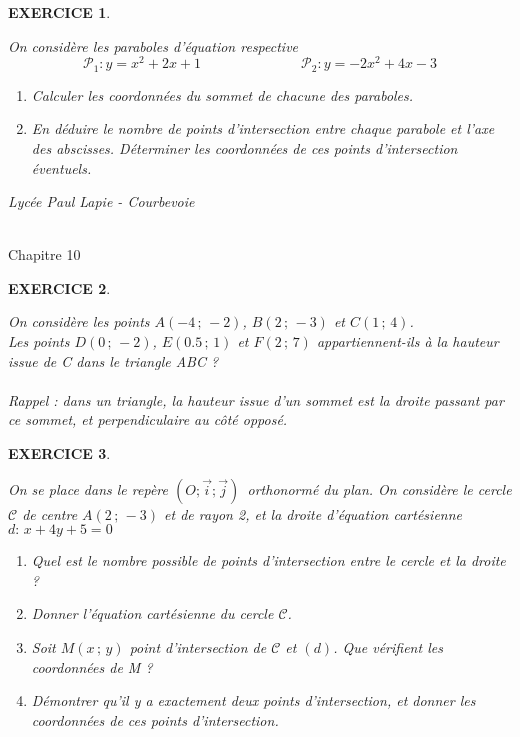 \documentclass[a4paper]{article}   %
\renewcommand{\(}{\left(}
\renewcommand{\)}{\right)}
\newtheorem{EXO}{\large EXERCICE }
\newenvironment{EX}   { \setcounter{ques}{0} \begin{EXO} \hrulefill ~\vspace{0.3cm}

\normalfont}    {\end{EXO} \medskip}
\newcommand{\ri}{$\left(O;\vec{i};\vec{j}\right)$}
\def\cl{{\large \bf{1èreG1}}}
\begin{document}
\begin{EX} On considère les paraboles d'équation respective 
$$\mathcal{P}_1 : y=x^2+2x+1 \hspace{3cm} \mathcal{P}_2 : y=-2x^2+4x-3 $$
\begin{enumerate}
\item Calculer les coordonnées du sommet de chacune des paraboles.
\item En déduire le nombre de points d'intersection entre chaque parabole et l'axe des abscisses. Déterminer les coordonnées de ces points d'intersection éventuels.
\end{enumerate}
\end{EX}


\newpage \setcounter{EXO}{0}
\noindent\begin{minipage}{.20\linewidth}\begin{center}                  
\noindent \emph{Lycée Paul Lapie - Courbevoie}
\end{center}\end{minipage}
\begin{minipage}{1.5\linewidth}\begin{center}	
\noindent \cl\\ Chapitre 10
\end{center}\end{minipage}

\begin{center} 	
\end{center}

\begin{EX} On considère les points $A(-4\,;\,-2)$, $B(2\,;\,-3)$ et $C(1\,;\,4)$. \\
Les points $D(0\,;\,-2)$, $E(0.5 \,;\, 1)$ et $F(2\,;\,7)$ appartiennent-ils à la hauteur issue de C dans le triangle ABC ? \\
~~\\
{\small{Rappel : dans un triangle, la hauteur issue d'un sommet est la droite passant par ce sommet, et perpendiculaire au côté opposé.}}

\end{EX}
\begin{EX} On se place dans le repère \ri \, orthonormé du plan. On considère le cercle $\mathcal{C}$ de centre $A(2\,;\,-3)$ et de rayon 2, et la droite d'équation cartésienne $d: \, x+4y+5=0$
\begin{enumerate}
\item Quel est le nombre possible de points d'intersection entre le cercle et la droite ?
\item Donner l'équation cartésienne du cercle $\mathcal{C}$.
\item Soit $M(x\,;\,y)$ point d'intersection de $\mathcal{C}$ et $(d)$. Que vérifient les coordonnées de M ?
\item Démontrer qu'il y a exactement deux points d'intersection, et donner les coordonnées de ces points d'intersection.
\end{enumerate}

\end{EX}
\end{document}
